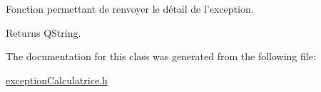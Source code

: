 Fonction permettant de renvoyer le détail de l'exception. 

\begin{DoxyReturn}{Returns}
Q\-String. 
\end{DoxyReturn}


The documentation for this class was generated from the following file\-:\begin{DoxyCompactItemize}
\item 
\hyperlink{exception_calculatrice_8h}{exception\-Calculatrice.\-h}\end{DoxyCompactItemize}
